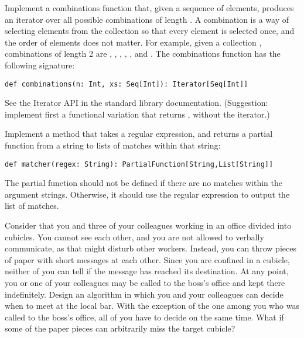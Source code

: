 \documentclass[11pt]{article}
\begin{document}
\begin{myExercise}
Implement a combinations function that, given a sequence of elements, produces an iterator over all possible combinations of length . A combination is a way of selecting elements from the collection so that every element is selected once, and the order of elements does not matter. For example, given a collection , combinations of length 2 are , , , , , and . The combinations function has the following signature:
\begin{lstlisting}
def combinations(n: Int, xs: Seq[Int]): Iterator[Seq[Int]]
\end{lstlisting}
See the Iterator API in the standard library documentation.
(Suggestion: implement first a functional variation that returns , without the iterator.)
\end{myExercise}

\begin{myExercise}
Implement a method that takes a regular expression, and returns a partial function from a string to lists of matches within that string:
\begin{lstlisting}
def matcher(regex: String): PartialFunction[String,List[String]]
\end{lstlisting}
The partial function should not be defined if there are no matches within the argument strings. Otherwise, it should use the regular expression to output the list of matches.
\end{myExercise}


\begin{myExercise}
Consider that you and three of your colleagues working in an office divided into cubicles. You cannot see each other, and you are not allowed to verbally communicate, as that might disturb other workers. Instead, you can throw pieces of paper with short messages at each other. Since you are confined in a cubicle, neither of you can tell if the message has reached its destination. At any point, you or one of your colleagues may be called to the boss's office and kept there indefinitely. Design an algorithm in which you and your colleagues can decide when to meet at the local bar. With the exception of the one among you who was called to the boss's office, all of you have to decide on the same time. What if some of the paper pieces can arbitrarily miss the target cubicle?
\end{myExercise}
\end{document}
